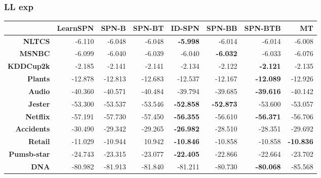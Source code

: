 \documentclass[xcolor={usenames,dvipsnames,svgnames}, compress]{beamer}
\begin{document}
\begin{frame}
  \frametitle{LL exp}
  \tiny
  \begin{table}[!htbp]
    \centering
     \setlength{\tabcolsep}{3pt}  
    \begin{tabular}{r r r r r r r r}
      \toprule
      & \textsf{LearnSPN} & \textsf{SPN-B} & \textsf{SPN-BT} & \textsf{ID-SPN}  & \textsf{SPN-BB}   & \textsf{SPN-BTB}  & \textsf{MT}      \\
      \midrule                                                                                     
      \textbf{NLTCS}      & -6.110            & -6.048         & -6.048          & \textbf{-5.998}  & -6.014            & -6.014            & -6.008           \\
      \textbf{MSNBC}      & -6.099            & -6.040         & -6.039          & -6.040           & \textbf{-6.032}   & -6.033            & -6.076           \\
      \textbf{KDDCup2k}   & -2.185            & -2.141         & -2.141          & -2.134           & -2.122            & \textbf{-2.121}   & -2.135           \\
      \textbf{Plants}     & -12.878           & -12.813        & -12.683         & -12.537          & -12.167           & \textbf{-12.089}  & -12.926          \\
      \textbf{Audio}      & -40.360           & -40.571        & -40.484         & -39.794          & -39.685           & \textbf{-39.616}  & -40.142          \\
      \textbf{Jester}     & -53.300           & -53.537        & -53.546         & \textbf{-52.858} & \textbf{-52.873}  & -53.600           & -53.057          \\
      \textbf{Netflix}    & -57.191           & -57.730        & -57.450         & \textbf{-56.355} & -56.610           & \textbf{-56.371}  & -56.706          \\
      \textbf{Accidents}  & -30.490           & -29.342        & -29.265         & \textbf{-26.982} & -28.510           & -28.351           & -29.692          \\
      \textbf{Retail}     & -11.029           & -10.944        & 10.942          & \textbf{-10.846} & -10.858           & -10.858           & \textbf{-10.836} \\
      \textbf{Pumsb-star} & -24.743           & -23.315        & -23.077         & \textbf{-22.405} & -22.866           & -22.664           & -23.702          \\
      \textbf{DNA}        & -80.982           & -81.913        & -81.840         & -81.211          & -80.730           & \textbf{-80.068}  & -85.568          \\

\end{tabular}
\end{table}
\end{frame}
\end{document}

